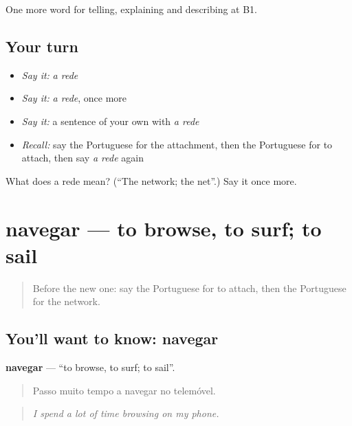\begin{grammarlens}[title={What you've built}]
One more word for telling, explaining and describing at B1.
\end{grammarlens}

\subsection*{Your turn}
\begin{itemize}
\raggedright
  \item \emph{Say it:} \emph{a rede}
  \item \emph{Say it:} \emph{a rede}, once more
  \item \emph{Say it:} a sentence of your own with \emph{a rede}
  \item \emph{Recall:} say the Portuguese for the attachment, then the Portuguese for to attach, then say \emph{a rede} again
\end{itemize}

\begin{tcolorbox}[breakable,colback=teal!4,colframe=teal!35!black,title={Before you move on}]
What does a rede mean? (\textquotedblleft{}The network; the net\textquotedblright{}.) Say it once more.
\end{tcolorbox}
\section[navegar]{navegar — to browse, to surf; to sail}

\label{lesson:PT-C399-navegar}



\begin{quote}
Before the new one: say the Portuguese for to attach, then the Portuguese for the network.
\end{quote}

\subsection*{You'll want to know: navegar}
\textbf{navegar} — \textquotedblleft{}to browse, to surf; to sail\textquotedblright{}.

\begin{quote}
Passo muito tempo a navegar no telemóvel.
\end{quote}

\begin{quote}
\emph{I spend a lot of time browsing on my phone.}
\end{quote}

